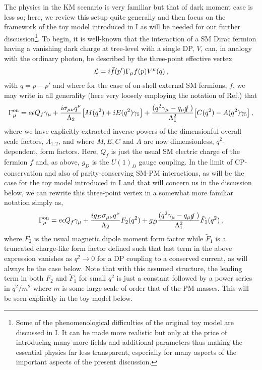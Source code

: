 \documentclass[14pt]{article}
\newcommand{\qslash}{\cancel{q}~}
\def\to{\rightarrow}
\begin{document}
The physics in the KM scenario is very familiar but that of dark moment case is less so; here, we review this setup quite generally and then focus on the framework of the toy model introduced in I 
as will be needed for our further discussion{\footnote {Some of the phenomenological difficulties of the original toy model are discussed in I. It can be made more realistic\cite{Rizzo:2023qbj} but only 
at the price of introducing many more fields and additional parameters thus making the essential physics far less transparent, especially for many aspects of the important aspects of the 
present discussion.}}.  To begin, it is well-known that the interaction of a SM Dirac fermion having a vanishing dark charge at tree-level with a single DP, $V$, can, in analogy with the ordinary 
photon, be described by the three-point effective vertex 
%
\begin{equation}
{\cal L} = i\bar f(p')\Gamma_\mu f(p) V^\mu (q)\,,  
\end{equation}
%
with $q=p-p'$ and where for the case of on-shell external SM fermions, $f$, we may write in all generality (here very loosely employing the notation of Ref.\cite{Chu:2018qrm}) that 
%
\begin{equation}
\Gamma^{\rm {on}}_\mu = e\epsilon Q_f \gamma_\mu+\frac{i\sigma_{\mu\nu} q^\nu}{\Lambda_2}\big[M(q^2)+iE(q^2)\gamma_5\big]+\frac{(q^2\gamma_\mu-q_\mu \qslash)}{\Lambda_1^2}\big[C(q^2)-A(q^2)\gamma_5 \big]\,,
\end{equation}
%
where we have explicitly extracted inverse powers of the dimensionful overall scale factors, $\Lambda_{1,2}$, and where $M,E,C$ and $A$ are now dimensionless, $q^2$-dependent, form 
factors. Here, $Q_f$ is just the 
usual SM electric charge of the fermion $f$ and, as above, $g_D$ is the $U(1)_D$ gauge coupling. In the limit of CP-conservation and also of parity-conserving SM-PM interactions, as will be 
the case for the toy model introduced in I and that will concern us in the discussion below, we can rewrite this three-point vertex in a somewhat more familiar notation simply as, 
%
\begin{equation}
\Gamma^{\rm {on}}_\mu = e\epsilon Q_f \gamma_\mu+\frac{ig_D\sigma_{\mu\nu} q^\nu}{\Lambda_2}F_2(q^2)+g_D\frac{(q^2\gamma_\mu-q_\mu \qslash)}{\Lambda_1^2}\tilde F_1(q^2)\,,
\end{equation}
%
where $F_2$ is the usual magnetic dipole moment form factor while $\tilde F_1$ is a truncated charge-like form factor defined such that last term in the above expression vanishes as $q^2\to 0$ for 
a DP coupling to a conserved current, as will always be the case below. Note that with this assumed structure, the leading term in both $F_2$ and $\tilde F_1$ for small $q^2$ is just 
a constant followed by a power series in $q^2/m^2$ where $m$ is some large scale of order that of the PM masses. This will be seen explicitly in the toy model below.
\end{document}
